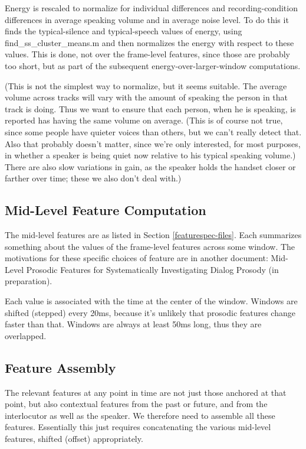 \documentclass[11pt]{article}
\begin{document}
Energy is rescaled to normalize for individual differences and
recording-condition differences in average speaking volume and in
average noise level.  To do this it finds the typical-silence and
typical-speech values of energy, using find\_ss\_cluster\_means.m and
then normalizes the energy with respect to these values.  This is
done, not over the frame-level features, since those are probably too
short, but as part of the subsequent energy-over-larger-window
computations.

(This is not the simplest way to normalize, but it seems suitable.
The average volume across tracks will vary with the amount of
speaking the person in that track is doing.  Thus we want to ensure
that each person, when he is speaking, is reported has having the same
volume on average.  (This is of course not true, since some people have
quieter voices than others, but we can't really detect that.  Also
that probably doesn't matter, since we're only interested, for most
purposes, in whether a speaker is being quiet now relative to his
typical speaking volume.)  There are also slow variations in gain, as
the speaker holds the handset closer or farther over time; these we
also don't deal with.)


\subsection{Mid-Level Feature Computation}   \label{other-features}

The mid-level features are as listed in Section
\ref{featurespec-files}.  Each summarizes something about the values
of the frame-level features across some window.  The motivations for
these specific choices of feature are in another document: Mid-Level
Prosodic Features for Systematically Investigating Dialog Prosody (in
preparation).

Each value is associated with the time at the center of the window.
Windows are shifted (stepped) every 20ms, because it's unlikely that
prosodic features change faster than that.  Windows are always at
least 50ms long, thus they are overlapped.



\subsection{Feature Assembly}

The relevant features at any point in time are not just those anchored
at that point, but also contextual features from the past or future,
and from the interlocutor as well as the speaker.  We therefore need
to assemble all these features.  
Essentially this just requires concatenating the various mid-level
features, shifted (offset) appropriately.
\end{document}
